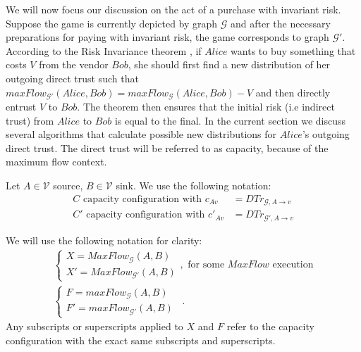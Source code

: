 We will now focus our discussion on the act of a purchase with invariant risk. Suppose the game is currently depicted by graph
$\mathcal{G}$ and after the necessary preparations for paying with invariant risk, the game corresponds to graph
$\mathcal{G}'$. According to the Risk Invariance theorem \cite{trustisrisk}, if $Alice$ wants to buy something that costs $V$
from the vendor $Bob$, she should first find a new distribution of her outgoing direct trust such that
$maxFlow_{\mathcal{G}'}\left(Alice, Bob\right) = maxFlow_{\mathcal{G}}\left(Alice, Bob\right) - V$ and then directly entrust
$V$ to $Bob$. The theorem then ensures that the initial risk (i.e indirect trust) from $Alice$ to $Bob$ is equal to the final.
In the current section we discuss several algorithms that calculate possible new distributions for $Alice$'s outgoing direct
trust. The direct trust will be referred to as capacity, because of the maximum flow context.

Let $A \in \mathcal{V}$ source, $B \in \mathcal{V}$ sink. We use the following notation:
\begin{align*}
  C \mbox{ capacity configuration with } c_{Av} &= DTr_{\mathcal{G}, A \rightarrow v} \\
  C' \mbox{ capacity configuration with } c'_{Av} &= DTr_{\mathcal{G}', A \rightarrow v}
\end{align*}

We will use the following notation for clarity:
\begin{equation*}
\begin{gathered}
  \begin{cases}
    X = MaxFlow_{\mathcal{G}}\left(A, B\right) \\
    X' = MaxFlow_{\mathcal{G}'}\left(A, B\right)
  \end{cases}, \mbox{ for some } MaxFlow \mbox{ execution} \\
  \begin{cases}
    F = maxFlow_{\mathcal{G}}\left(A, B\right) \\
    F' = maxFlow_{\mathcal{G}'}\left(A, B\right)
  \end{cases}
  \enspace.
\end{gathered}
\end{equation*}
Any subscripts or superscripts applied to $X$ and $F$ refer to the capacity configuration with the exact same subscripts and
superscripts.

